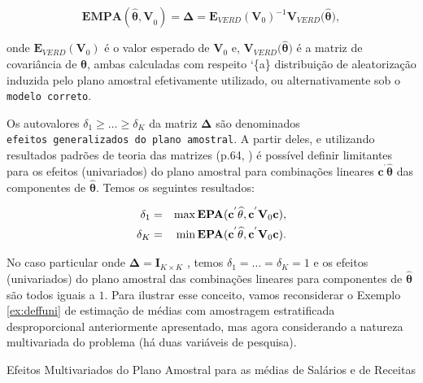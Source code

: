 \documentclass[]{book}
\numberwithin{example}{chapter}
\numberwithin{remark}{chapter}
\numberwithin{definition}{chapter}
\let\BeginKnitrBlock\begin \let\EndKnitrBlock\end
\begin{document}
\begin{equation}
\mathbf{EMPA}(\mathbf{\hat{\theta},V}_{0})=\mathbf{\Delta =E}_{VERD}\left( 
\mathbf{V}_{0}\right) ^{-1}\mathbf{V}_{VERD}(\mathbf{\hat{\theta}),}
\label{eq:epa6}
\end{equation}

onde \(\mathbf{E}_{VERD}\left( \mathbf{V}_{0}\right)\) é o valor
esperado de \(\mathbf{V}_{0}\) e,
\(\mathbf{V}_{VERD}(\mathbf{\hat{\theta})}\) é a matriz de covariância
de \(\mathbf{\hat{\theta}}\), ambas calculadas com respeito `\{a\}
distribuição de aleatorização induzida pelo plano amostral efetivamente
utilizado, ou alternativamente sob o \texttt{modelo\ correto}.

Os autovalores \(\delta _{1}\geq \ldots \geq \delta _{K}\) da matriz
\(\mathbf{\Delta }\) são denominados
\texttt{efeitos\ generalizados\ do\ plano\ amostral}. A partir deles, e
utilizando resultados padrões de teoria das matrizes (p.64,
\citep{Johnson}) é possível definir limitantes para os efeitos
(univariados) do plano amostral para combinações lineares
\(\mathbf{c}^{^{\prime }}\widehat{\mathbf{\theta }}\) das componentes de
\(\widehat{\mathbf{\theta }}\). Temos os seguintes resultados:

\begin{eqnarray*}
\delta _{1} &=&\max \mathbf{EPA}(\mathbf{c}^{^{\prime }}\widehat{\mathbf{%
\theta }}\mathbf{,c}^{^{\prime }}\mathbf{V}_{0}\mathbf{c)}, \\
\delta _{K} &=&\min \mathbf{EPA}(\mathbf{c}^{^{\prime }}\widehat{\mathbf{\theta }}\mathbf{,c}^{^{\prime }}\mathbf{V}_{0}\mathbf{c)}.
\end{eqnarray*}

No caso particular onde \(\mathbf{\Delta =I}_{K\times K}\) , temos
\(\delta_{1}=\ldots =\delta _{K}=1\) e os efeitos (univariados) do plano
amostral das combinações lineares para componentes de
\(\mathbf{\hat{\theta}}\) são todos iguais a \(1\). Para ilustrar esse
conceito, vamos reconsiderar o Exemplo \ref{ex:deffuni} de estimação de
médias com amostragem estratificada desproporcional anteriormente
apresentado, mas agora considerando a natureza multivariada do problema
(há duas variáveis de pesquisa).

\BeginKnitrBlock{example}
\protect\hypertarget{ex:deffmult}{}{\label{ex:deffmult}}Efeitos
Multivariados do Plano Amostral para as médias de Salários e de Receitas
\EndKnitrBlock{example}
\end{document}
